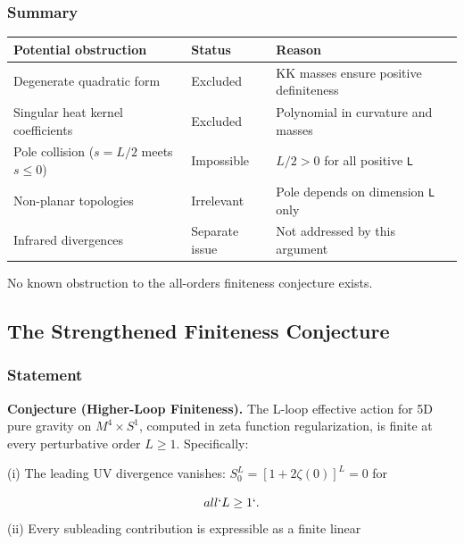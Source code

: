 \documentclass[aps,prd,preprint,superscriptaddress,longbibliography,floatfix]{revtex4-2}
\theoremstyle{remark}
\begin{document}
\subsubsection{Summary}


\begin{table}[H]
\begin{ruledtabular}
\begin{tabular}{p{5.0cm}p{5.0cm}p{5.0cm}}
Potential obstruction & Status & Reason \\
\hline
Degenerate quadratic form & Excluded & KK masses ensure positive definiteness \\
Singular heat kernel coefficients & Excluded & Polynomial in curvature and masses \\
Pole collision ($s = L/2$ meets $s \leq 0$) & Impossible & $L/2 > 0$ for all positive \texttt{L} \\
Non-planar topologies & Irrelevant & Pole depends on dimension \texttt{L} only \\
Infrared divergences & Separate issue & Not addressed by this argument \\
\end{tabular}
\end{ruledtabular}
\end{table}

No known obstruction to the all-orders finiteness conjecture exists.



\subsection{The Strengthened Finiteness Conjecture}


\subsubsection{Statement}

\textbf{Conjecture (Higher-Loop Finiteness).} The L-loop effective action for 5D pure gravity on $M^{4} \times S^{1}$, computed in zeta function regularization, is finite at every perturbative order $L \geq 1$. Specifically:

(i) The leading UV divergence vanishes: $S_{0}^L = [1 + 2\zeta(0)]^L = 0$ for

\begin{equation}
    all `L \geq 1`.
\end{equation}
(ii) Every subleading contribution is expressible as a finite linear
\end{document}
